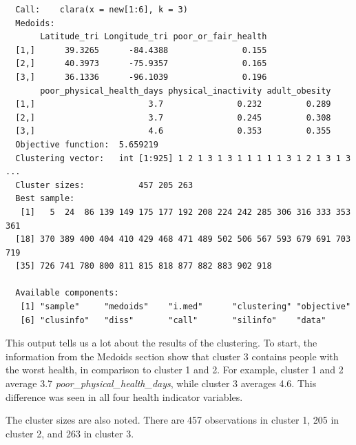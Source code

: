 \documentclass[12pt,twoside]{amherstthesis}
\begin{document}
  \begin{Shaded}
  \begin{Highlighting}[]
  \end{Highlighting}
  \end{Shaded}
  
  \begin{verbatim}
  Call:    clara(x = new[1:6], k = 3) 
  Medoids:
       Latitude_tri Longitude_tri poor_or_fair_health
  [1,]      39.3265      -84.4388               0.155
  [2,]      40.3973      -75.9357               0.165
  [3,]      36.1336      -96.1039               0.196
       poor_physical_health_days physical_inactivity adult_obesity
  [1,]                       3.7               0.232         0.289
  [2,]                       3.7               0.245         0.308
  [3,]                       4.6               0.353         0.355
  Objective function:  5.659219
  Clustering vector:   int [1:925] 1 2 1 3 1 3 1 1 1 1 1 3 1 2 1 3 1 3 ...
  Cluster sizes:           457 205 263 
  Best sample:
   [1]   5  24  86 139 149 175 177 192 208 224 242 285 306 316 333 353 361
  [18] 370 389 400 404 410 429 468 471 489 502 506 567 593 679 691 703 719
  [35] 726 741 780 800 811 815 818 877 882 883 902 918
  
  Available components:
   [1] "sample"     "medoids"    "i.med"      "clustering" "objective" 
   [6] "clusinfo"   "diss"       "call"       "silinfo"    "data"      
  \end{verbatim}
  
  This output tells us a lot about the results of the clustering. To
  start, the information from the Medoids section show that cluster 3
  contains people with the worst health, in comparison to cluster 1 and 2.
  For example, cluster 1 and 2 average 3.7
  \emph{poor\_physical\_health\_days}, while cluster 3 averages 4.6. This
  difference was seen in all four health indicator variables.
  
  The cluster sizes are also noted. There are 457 observations in cluster
  1, 205 in cluster 2, and 263 in cluster 3.
  
  \begin{Shaded}
  \begin{Highlighting}[]
  
  \OperatorTok{$}
  \OperatorTok{$}
  \end{Highlighting}
  \end{Shaded}
  
\end{document}
